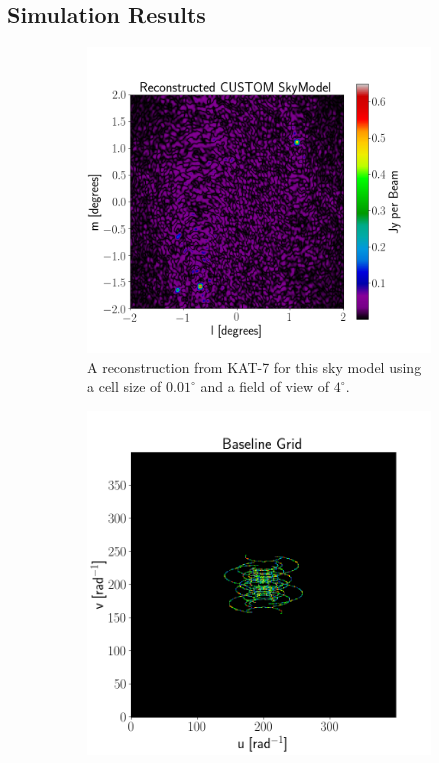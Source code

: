 \subsection{Simulation Results}
\begin{figure}[H]
  \centering
  \begin{subfigure}[b]{0.49\textwidth}
    \centering
    \includegraphics[scale=0.3]{images/RECON_KAT_7_4_POINT.png}
    \caption{A reconstruction from KAT-7 for this sky model using a cell size of $0.01^\circ$ and a 
    field of view of $4^\circ$.}
    \label{fig:kat-7_recon}
  \end{subfigure}
  \begin{subfigure}[b]{0.49\textwidth}
    \centering
    \includegraphics[scale=0.3]{images/KAT_7_4_POINT_GRID.png}

\end{subfigure}
\end{figure}
